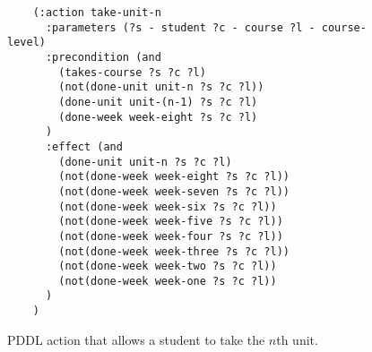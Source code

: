 \begin{figure}[t]
    \begin{lstlisting}
    (:action take-unit-n
      :parameters (?s - student ?c - course ?l - course-level)
      :precondition (and 
        (takes-course ?s ?c ?l)
        (not(done-unit unit-n ?s ?c ?l))
        (done-unit unit-(n-1) ?s ?c ?l)
        (done-week week-eight ?s ?c ?l)
      )
      :effect (and
        (done-unit unit-n ?s ?c ?l)
        (not(done-week week-eight ?s ?c ?l))
        (not(done-week week-seven ?s ?c ?l))
        (not(done-week week-six ?s ?c ?l))
        (not(done-week week-five ?s ?c ?l))
        (not(done-week week-four ?s ?c ?l))
        (not(done-week week-three ?s ?c ?l))
        (not(done-week week-two ?s ?c ?l))
        (not(done-week week-one ?s ?c ?l))
      )
    )
    \end{lstlisting}
    \caption{PDDL action that allows a student to take the $n$th unit.}\label{fig:pddl-action-take-unit-n}
\end{figure}